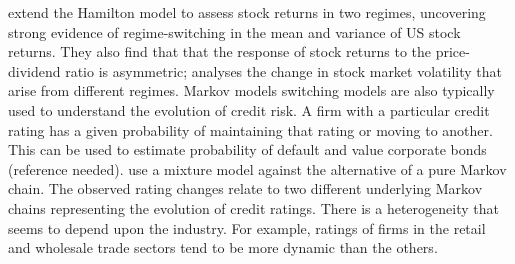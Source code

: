 \documentclass[12pt, a4paper, oneside]{article} %
\begin{document}
\citet{schaller1997regime} extend the Hamilton model to assess stock returns in two regimes, uncovering strong evidence of regime-switching in the mean and variance of US stock returns.  They also find that that the response of stock returns to the price-dividend ratio is asymmetric; \citet{dueker1997markov} analyses the change in stock market volatility that arise from different regimes. Markov models switching models are also typically used to understand the evolution of credit risk.  A firm with a particular credit rating has a given probability of maintaining that rating or moving to another.  This can be used to estimate probability of default and value corporate bonds (reference needed).  \citet{frydman2008credit} use a mixture model against the alternative of a pure Markov chain. The observed rating changes relate to two different underlying Markov chains representing the evolution of credit ratings.  There is a heterogeneity that seems to depend upon the industry.  For example, ratings of firms in the retail and wholesale trade sectors tend to be more dynamic than the others. 





\end{document}
